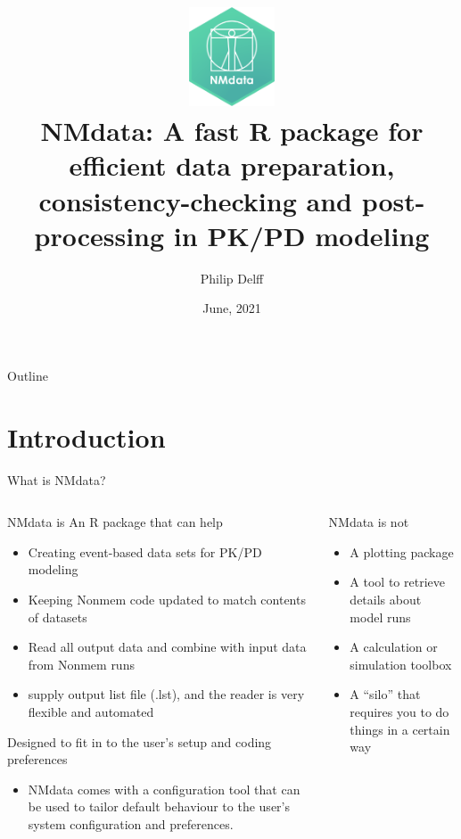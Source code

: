 \documentclass[
  8pt,
  ignorenonframetext,
  aspectratio=169]{beamer}
\title{\includegraphics[width=1in,height=\textheight]{../../man/figures/NMdata_logo_v01.png}\\
NMdata: A fast R package for efficient data preparation,
consistency-checking and post-processing in PK/PD modeling}
\author{Philip Delff}
\date{June, 2021}
\providecommand{\tightlist}{%
  \setlength{\itemsep}{0pt}\setlength{\parskip}{0pt}}
\begin{document}
\frame{\titlepage}

\begin{frame}
\end{frame}

\begin{frame}{Outline}
\protect\hypertarget{outline}{}
\tableofcontents[hideallsubsections]
\end{frame}

\hypertarget{introduction}{%
\section{Introduction}\label{introduction}}

\begin{frame}{What is NMdata?}
\protect\hypertarget{what-is-nmdata}{}
\begin{columns}[T]
\begin{column}{0.48\textwidth}
\begin{block}{NMdata is}
\protect\hypertarget{nmdata-is}{}
An R package that can help

\begin{itemize}
\tightlist
\item
  Creating event-based data sets for PK/PD modeling
\item
  Keeping Nonmem code updated to match contents of datasets
\item
  Read all output data and combine with input data from Nonmem runs
\item
  supply output list file (.lst), and the reader is very flexible and
  automated
\end{itemize}

Designed to fit in to the user's setup and coding preferences

\begin{itemize}
\tightlist
\item
  NMdata comes with a configuration tool that can be used to tailor
  default behaviour to the user's system configuration and preferences.
\end{itemize}
\end{block}
\end{column}

\begin{column}{0.48\textwidth}
\begin{block}{NMdata is not}
\protect\hypertarget{nmdata-is-not}{}
\begin{itemize}
\item
  A plotting package
\item
  A tool to retrieve details about model runs
\item
  A calculation or simulation toolbox
\item
  A ``silo'' that requires you to do things in a certain way


\end{itemize}
\end{block}
\end{column}
\end{columns}
\end{frame}
\end{document}
